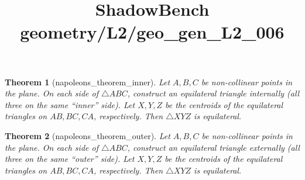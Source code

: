\documentclass{article}
\title{ShadowBench geometry/L2/geo\_gen\_L2\_006}
\newtheorem{theorem}{Theorem}
\begin{document}
\maketitle

\begin{theorem}[napoleons_theorem_inner]\label{thm:napoleon_inner}
Let $A,B,C$ be non-collinear points in the plane.
On each side of $\triangle ABC$, construct an equilateral triangle \emph{internally} (all three on the same ``inner'' side).
Let $X,Y,Z$ be the centroids of the equilateral triangles on $AB,BC,CA$, respectively.
Then $\triangle XYZ$ is equilateral.
\end{theorem}

\begin{theorem}[napoleons_theorem_outer]\label{thm:napoleon_outer}
Let $A,B,C$ be non-collinear points in the plane.
On each side of $\triangle ABC$, construct an equilateral triangle \emph{externally} (all three on the same ``outer'' side).
Let $X,Y,Z$ be the centroids of the equilateral triangles on $AB,BC,CA$, respectively.
Then $\triangle XYZ$ is equilateral.
\end{theorem}
\end{document}
